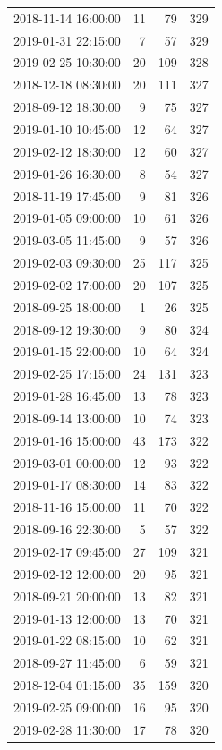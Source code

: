 \begin{tabular}{lrrr}
2018-11-14 16:00:00 & 11 & 79 & 329 \\
2019-01-31 22:15:00 & 7 & 57 & 329 \\
2019-02-25 10:30:00 & 20 & 109 & 328 \\
2018-12-18 08:30:00 & 20 & 111 & 327 \\
2018-09-12 18:30:00 & 9 & 75 & 327 \\
2019-01-10 10:45:00 & 12 & 64 & 327 \\
2019-02-12 18:30:00 & 12 & 60 & 327 \\
2019-01-26 16:30:00 & 8 & 54 & 327 \\
2018-11-19 17:45:00 & 9 & 81 & 326 \\
2019-01-05 09:00:00 & 10 & 61 & 326 \\
2019-03-05 11:45:00 & 9 & 57 & 326 \\
2019-02-03 09:30:00 & 25 & 117 & 325 \\
2019-02-02 17:00:00 & 20 & 107 & 325 \\
2018-09-25 18:00:00 & 1 & 26 & 325 \\
2018-09-12 19:30:00 & 9 & 80 & 324 \\
2019-01-15 22:00:00 & 10 & 64 & 324 \\
2019-02-25 17:15:00 & 24 & 131 & 323 \\
2019-01-28 16:45:00 & 13 & 78 & 323 \\
2018-09-14 13:00:00 & 10 & 74 & 323 \\
2019-01-16 15:00:00 & 43 & 173 & 322 \\
2019-03-01 00:00:00 & 12 & 93 & 322 \\
2019-01-17 08:30:00 & 14 & 83 & 322 \\
2018-11-16 15:00:00 & 11 & 70 & 322 \\
2018-09-16 22:30:00 & 5 & 57 & 322 \\
2019-02-17 09:45:00 & 27 & 109 & 321 \\
2019-02-12 12:00:00 & 20 & 95 & 321 \\
2018-09-21 20:00:00 & 13 & 82 & 321 \\
2019-01-13 12:00:00 & 13 & 70 & 321 \\
2019-01-22 08:15:00 & 10 & 62 & 321 \\
2018-09-27 11:45:00 & 6 & 59 & 321 \\
2018-12-04 01:15:00 & 35 & 159 & 320 \\
2019-02-25 09:00:00 & 16 & 95 & 320 \\
2019-02-28 11:30:00 & 17 & 78 & 320 \\

\end{tabular}
